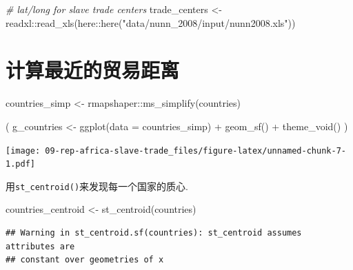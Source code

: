 \documentclass[
  oneside]{book}
\newenvironment{Shaded}{\begin{snugshade}}{\end{snugshade}}
\newcommand{\AttributeTok}[1]{\textcolor[rgb]{0.77,0.63,0.00}{#1}}
\newcommand{\CommentTok}[1]{\textcolor[rgb]{0.56,0.35,0.01}{\textit{#1}}}
\newcommand{\FunctionTok}[1]{\textcolor[rgb]{0.00,0.00,0.00}{#1}}
\newcommand{\NormalTok}[1]{#1}
\newcommand{\OtherTok}[1]{\textcolor[rgb]{0.56,0.35,0.01}{#1}}
\newcommand{\SpecialCharTok}[1]{\textcolor[rgb]{0.00,0.00,0.00}{#1}}
\newcommand{\StringTok}[1]{\textcolor[rgb]{0.31,0.60,0.02}{#1}}
\begin{document}
\begin{Shaded}
\begin{Highlighting}[]
\CommentTok{\# lat/long for slave trade centers}
\NormalTok{trade\_centers }\OtherTok{\textless{}{-}}\NormalTok{ readxl}\SpecialCharTok{::}\FunctionTok{read\_xls}\NormalTok{(here}\SpecialCharTok{::}\FunctionTok{here}\NormalTok{(}\StringTok{"data/nunn\_2008/input/nunn2008.xls"}\NormalTok{))}
\end{Highlighting}
\end{Shaded}

\hypertarget{ux8ba1ux7b97ux6700ux8fd1ux7684ux8d38ux6613ux8dddux79bb}{%
\section{计算最近的贸易距离}\label{ux8ba1ux7b97ux6700ux8fd1ux7684ux8d38ux6613ux8dddux79bb}}

\begin{Shaded}
\begin{Highlighting}[]
\NormalTok{countries\_simp }\OtherTok{\textless{}{-}}\NormalTok{ rmapshaper}\SpecialCharTok{::}\FunctionTok{ms\_simplify}\NormalTok{(countries)}
\end{Highlighting}
\end{Shaded}

\begin{Shaded}
\begin{Highlighting}[]
\NormalTok{(}
\NormalTok{  g\_countries }\OtherTok{\textless{}{-}}
    \FunctionTok{ggplot}\NormalTok{(}\AttributeTok{data =}\NormalTok{ countries\_simp) }\SpecialCharTok{+}
    \FunctionTok{geom\_sf}\NormalTok{() }\SpecialCharTok{+}
    \FunctionTok{theme\_void}\NormalTok{()}
\NormalTok{)}
\end{Highlighting}
\end{Shaded}

\texttt{[image: 09-rep-africa-slave-trade\_files/figure-latex/unnamed-chunk-7-1.pdf]}

用\texttt{st\_centroid()}来发现每一个国家的质心.

\begin{Shaded}
\begin{Highlighting}[]
\NormalTok{countries\_centroid }\OtherTok{\textless{}{-}} \FunctionTok{st\_centroid}\NormalTok{(countries)}
\end{Highlighting}
\end{Shaded}

\begin{verbatim}
## Warning in st_centroid.sf(countries): st_centroid assumes attributes are
## constant over geometries of x
\end{verbatim}
\end{document}
